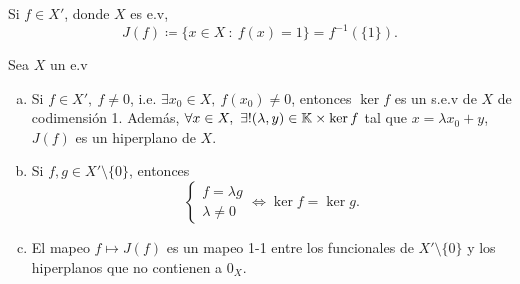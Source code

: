 \begin{notation}
	Si $f \in X'$, donde $X$ es e.v,
	\[ J(f) \coloneq \{x \in X \ : \ f(x) = 1\} = f^{-1}(\{1\}). \]  
\end{notation}

\begin{prop}
	Sea $X$ un e.v
	\begin{enumerate}[a)]
		\item Si $f \in X',\ f \neq 0$, i.e. $\exists x_{0} \in X,\ f(x_{0}) \neq 0$, entonces $\ker f$ es un s.e.v de $X$ de codimensión 1. Además, $\forall x \in X,\ \exists! (\lambda, y) \in \mbb{K} \times \ker f$ tal que $x = \lambda x_{0} + y$, $J(f)$ es un hiperplano de $X$. 

		\item Si $f,g \in X' \setminus \{0\}$, entonces
		\[ \begin{cases}
			f = \lambda g \\
			\lambda \neq 0
		\end{cases} \iff \ker f = \ker g. \]

		\item El mapeo $f \mapsto J(f)$ es un mapeo 1-1 entre los funcionales de $X' \setminus \{0\}$ y los hiperplanos que no contienen a $0_{X}$. 
	\end{enumerate}
\end{prop}
